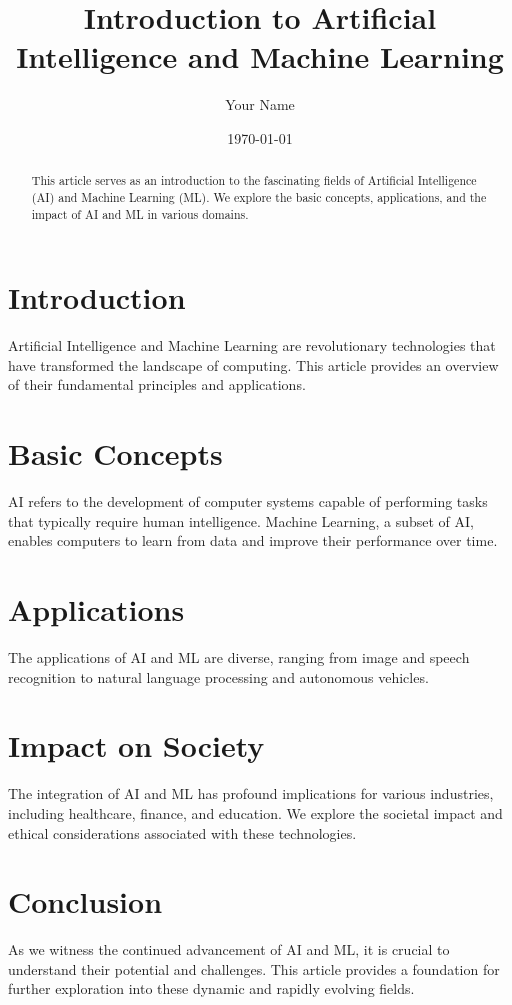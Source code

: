 \documentclass[a4paper,12pt]{article}
\title{Introduction to Artificial Intelligence and Machine Learning}
\author{Your Name}
\date{\today}
\begin{document}
\maketitle

\begin{abstract}
    This article serves as an introduction to the fascinating fields of Artificial Intelligence (AI) and Machine Learning (ML). We explore the basic concepts, applications, and the impact of AI and ML in various domains.
\end{abstract}

\section{Introduction}
Artificial Intelligence and Machine Learning are revolutionary technologies that have transformed the landscape of computing. This article provides an overview of their fundamental principles and applications.

\section{Basic Concepts}
AI refers to the development of computer systems capable of performing tasks that typically require human intelligence. Machine Learning, a subset of AI, enables computers to learn from data and improve their performance over time.

\section{Applications}
The applications of AI and ML are diverse, ranging from image and speech recognition to natural language processing and autonomous vehicles.

\section{Impact on Society}
The integration of AI and ML has profound implications for various industries, including healthcare, finance, and education. We explore the societal impact and ethical considerations associated with these technologies.

\section{Conclusion}
As we witness the continued advancement of AI and ML, it is crucial to understand their potential and challenges. This article provides a foundation for further exploration into these dynamic and rapidly evolving fields.
\end{document}
